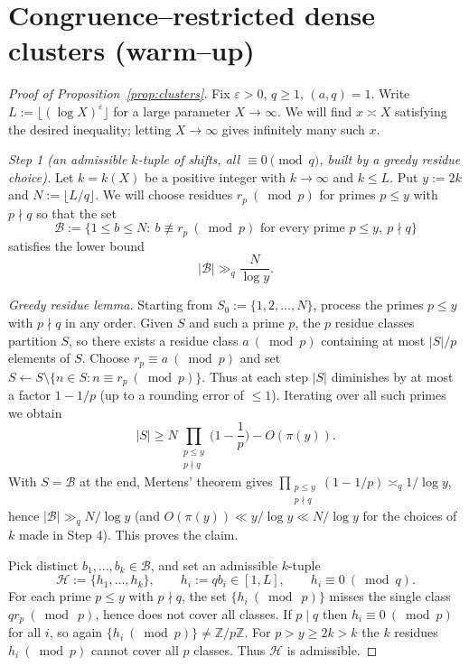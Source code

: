 \documentclass[11pt]{amsart}
\theoremstyle{definition}
\theoremstyle{remark}
\numberwithin{equation}{section}
\begin{document}
\section{Congruence--restricted dense clusters (warm--up)}
\begin{proof}[Proof of Proposition~\ref{prop:clusters}]
Fix $\varepsilon>0$, $q\ge1$, $(a,q)=1$. Write $L:=\lfloor(\log X)^{\varepsilon}\rfloor$ for a large parameter $X\to\infty$. We will find $x\asymp X$ satisfying the desired inequality; letting $X\to\infty$ gives infinitely many such $x$.

\smallskip
\noindent\emph{Step 1 (an admissible $k$-tuple of shifts, all $\equiv0\pmod q$, built by a greedy residue choice).}
Let $k=k(X)$ be a positive integer with $k\to\infty$ and $k\le L$. Put $y:=2k$ and $N:=\lfloor L/q\rfloor$. We will choose residues $r_p\ (\bmod p)$ for primes $p\le y$ with $p\nmid q$ so that the set
\[
\mathcal B:=\Big\{1\le b\le N:\ b\not\equiv r_p\ (\bmod p)\text{ for every prime }p\le y,\ p\nmid q\Big\}
\]
satisfies the lower bound
\[
|\mathcal B|\gg_{q}\frac{N}{\log y}.
\]

\emph{Greedy residue lemma.}
Starting from $S_0:=\{1,2,\dots,N\}$, process the primes $p\le y$ with $p\nmid q$ in any order. Given $S$ and such a prime $p$, the $p$ residue classes partition $S$, so there exists a residue class $a\ (\bmod p)$ containing at most $|S|/p$ elements of $S$. Choose $r_p\equiv a\ (\bmod p)$ and set $S\leftarrow S\setminus\{n\in S: n\equiv r_p\ (\bmod p)\}$. Thus at each step $|S|$ diminishes by at most a factor $1-1/p$ (up to a rounding error of $\le1$). Iterating over all such primes we obtain
\[
|S|\ge N\prod_{\substack{p\le y\\ p\nmid q}}\Big(1-\frac1p\Big)-O(\pi(y)).
\]
With $S=\mathcal B$ at the end, Mertens’ theorem gives $\prod_{\substack{p\le y\\ p\nmid q}}(1-1/p)\asymp_q 1/\log y$, hence $|\mathcal B|\gg_q N/\log y$ (and $O(\pi(y))\ll y/\log y\ll N/\log y$ for the choices of $k$ made in Step 4). This proves the claim.

Pick distinct $b_1,\dots,b_k\in\mathcal B$, and set an admissible $k$-tuple
\[
\mathcal H:=\{h_1,\dots,h_k\},\qquad h_i:=q b_i\in[1,L],\qquad h_i\equiv0\ (\bmod q).
\]
For each prime $p\le y$ with $p\nmid q$, the set $\{h_i\ (\bmod\ p)\}$ misses the single class $q r_p\ (\bmod\ p)$, hence does not cover all classes. If $p\mid q$ then $h_i\equiv0\ (\bmod p)$ for all $i$, so again $\{h_i\ (\bmod p)\}\ne\mathbb Z/p\mathbb Z$. For $p>y\ge2k>k$ the $k$ residues $h_i\ (\bmod p)$ cannot cover all $p$ classes. Thus $\mathcal H$ is admissible.


\end{proof}
\end{document}
